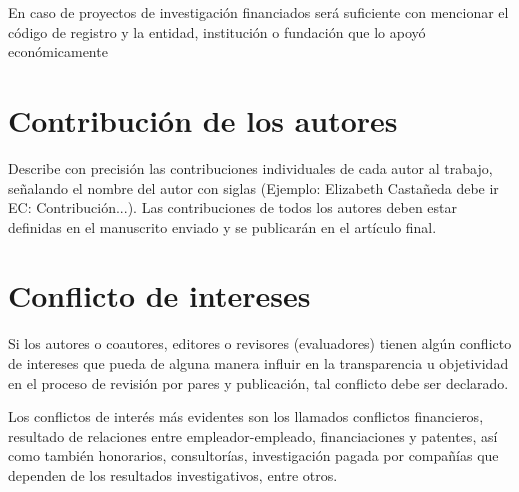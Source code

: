 \documentclass[9pt]{article}
\begin{document}
En caso de proyectos de investigación financiados será suficiente con mencionar el código de registro y la entidad, institución o fundación que lo apoyó económicamente


\section*{Contribución de los autores}

Describe con precisión las contribuciones individuales de cada autor al trabajo, señalando el nombre del autor con siglas (Ejemplo: Elizabeth Castañeda debe ir EC: Contribución...). Las contribuciones de todos los autores deben estar definidas en el manuscrito enviado y se publicarán en el artículo final.


\section*{Conflicto de intereses}

Si los autores o coautores, editores o revisores (evaluadores) tienen algún conflicto de intereses que pueda de alguna manera influir en la transparencia u objetividad en el proceso de revisión por pares y publicación, tal conflicto debe ser declarado.

Los conflictos de interés más evidentes son los llamados conflictos financieros, resultado de relaciones entre empleador-empleado, financiaciones y patentes, así como también honorarios, consultorías, investigación pagada por compañías que dependen de los resultados investigativos, entre otros.


\printbibliography
\end{document}

